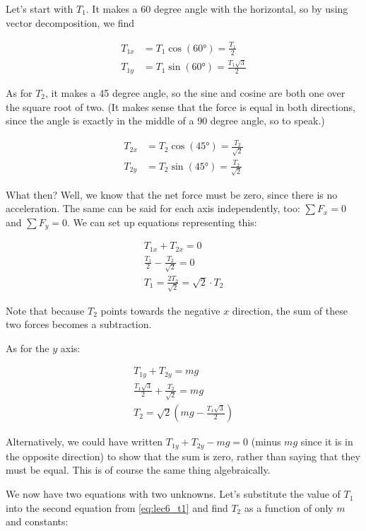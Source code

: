 Let's start with $T_1$. It makes a 60 degree angle with the horizontal, so by using vector decomposition, we find

\begin{align}
T_{1x} &= T_1 \cos(\ang{60}) = \frac{T_1}{2}\\
T_{1y} &= T_1 \sin(\ang{60}) = \frac{T_1 \sqrt{3}}{2}
\end{align}

As for $T_2$, it makes a 45 degree angle, so the sine and cosine are both one over the square root of two. (It makes sense that the force is equal in both directions, since the angle is exactly in the middle of a 90 degree angle, so to speak.)

\begin{align}
T_{2x} &= T_2 \cos(\ang{45}) = \frac{T_2}{\sqrt{2}}\\
T_{2y} &= T_2 \sin(\ang{45}) = \frac{T_2}{\sqrt{2}}
\end{align}

What then? Well, we know that the net force must be zero, since there is no acceleration. The same can be said for each axis independently, too: $\sum F_x = 0$ and $\sum F_y = 0$. We can set up equations representing this:

\begin{align}
T_{1x} + T_{2x} = 0\\
\frac{T_1}{2} - \frac{T_2}{\sqrt{2}} = 0\\
T_1 = \frac{2 T_2}{\sqrt{2}} = \sqrt{2} \cdot T_2 \label{eq:lec6_t1}
\end{align}

Note that because $T_2$ points towards the negative $x$ direction, the sum of these two forces becomes a subtraction.

As for the $y$ axis:

\begin{align}
T_{1y} + T_{2y} = m g\\
\frac{T_1 \sqrt{3}}{2} + \frac{T_2}{\sqrt{2}} = m g\\
T_2 = \sqrt{2}\left(m g - \frac{T_1 \sqrt{3}}{2}\right)
\end{align}

Alternatively, we could have written $T_{1y} + T_{2y} - m g = 0$ (minus $m g$ since it is in the opposite direction) to show that the sum is zero, rather than saying that they must be equal. This is of course the same thing algebraically.

We now have two equations with two unknowns. Let's substitute the value of $T_1$ into the second equation from \eqref{eq:lec6_t1} and find $T_2$ as a function of only $m$ and constants:

